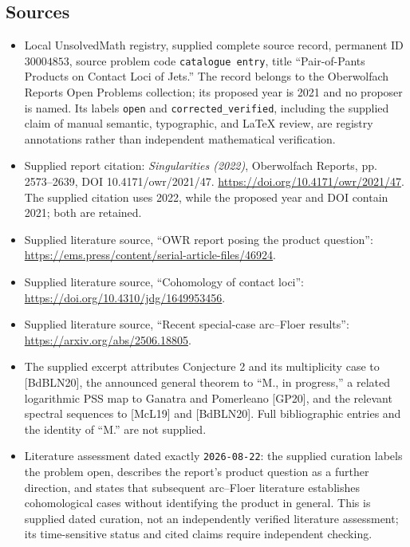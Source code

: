 \documentclass[11pt]{article}
\begin{document}
\subsection{Sources}
\begin{itemize}
\item Local UnsolvedMath registry, supplied complete source record, permanent ID \(30004853\), source problem code \texttt{catalogue entry}, title ``Pair-of-Pants Products on Contact Loci of Jets.'' The record belongs to the Oberwolfach Reports Open Problems collection; its proposed year is 2021 and no proposer is named. Its labels \texttt{open} and \texttt{corrected\_verified}, including the supplied claim of manual semantic, typographic, and LaTeX review, are registry annotations rather than independent mathematical verification.
\item Supplied report citation: \emph{Singularities (2022)}, Oberwolfach Reports, pp. 2573--2639, DOI 10.4171/owr/2021/47. \url{https://doi.org/10.4171/owr/2021/47}. The supplied citation uses 2022, while the proposed year and DOI contain 2021; both are retained.
\item Supplied literature source, ``OWR report posing the product question'': \url{https://ems.press/content/serial-article-files/46924}.
\item Supplied literature source, ``Cohomology of contact loci'': \url{https://doi.org/10.4310/jdg/1649953456}.
\item Supplied literature source, ``Recent special-case arc--Floer results'': \url{https://arxiv.org/abs/2506.18805}.
\item The supplied excerpt attributes Conjecture 2 and its multiplicity case to [BdBLN20], the announced general theorem to ``M., in progress,'' a related logarithmic PSS map to Ganatra and Pomerleano [GP20], and the relevant spectral sequences to [McL19] and [BdBLN20]. Full bibliographic entries and the identity of ``M.'' are not supplied.
\item Literature assessment dated exactly \texttt{2026-08-22}: the supplied curation labels the problem open, describes the report's product question as a further direction, and states that subsequent arc--Floer literature establishes cohomological cases without identifying the product in general. This is supplied dated curation, not an independently verified literature assessment; its time-sensitive status and cited claims require independent checking.
\end{itemize}
\end{document}
